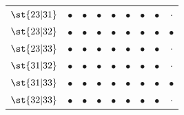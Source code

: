 \begin{table}[H]
\begin{tabular}{lcccccccc}
$\st{23|31}$ & $\bullet$ & $\bullet$ & $\bullet$ & $\bullet$ & $\bullet$ & $\bullet$ & $\bullet$ & $\cdot$ \\
$\st{23|32}$ & $\bullet$ & $\bullet$ & $\bullet$ & $\bullet$ & $\bullet$ & $\bullet$ & $\bullet$ & $\bullet$ \\
$\st{23|33}$ & $\bullet$ & $\bullet$ & $\bullet$ & $\bullet$ & $\bullet$ & $\bullet$ & $\bullet$ & $\cdot$ \\
$\st{31|32}$ & $\bullet$ & $\bullet$ & $\bullet$ & $\bullet$ & $\bullet$ & $\bullet$ & $\bullet$ & $\cdot$ \\
$\st{31|33}$ & $\bullet$ & $\bullet$ & $\bullet$ & $\bullet$ & $\bullet$ & $\bullet$ & $\bullet$ & $\bullet$ \\
$\st{32|33}$ & $\bullet$ & $\bullet$ & $\bullet$ & $\bullet$ & $\bullet$ & $\bullet$ & $\bullet$ & $\cdot$ \\
\bottomrule
\end{tabular}
\end{table}
